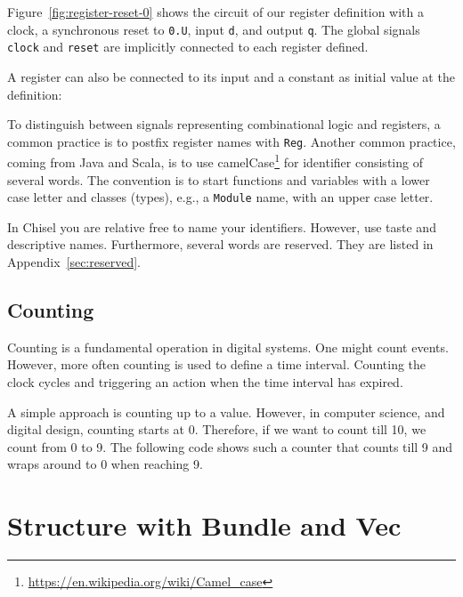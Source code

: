 \documentclass[%
    10pt,
    headinclude, footexclude,
    openright, %
    notitlepage,
    cleardoubleempty,
    headsepline,
    pointlessnumbers,
    bibtotoc, idxtotoc,
    ]{scrbook}
\newcommand{\code}[1]{{\small{\texttt{#1}}}}
\newcommand{\myref}[2]{\href{#1}{#2}}
\renewcommand{\myref}[2]{{#2}{\footnote{\url{#1}}}}
\begin{document}

Figure~\ref{fig:register-reset-0} shows the circuit of our register definition with
a clock, a synchronous reset to \code{0.U}, input \code{d}, and output \code{q}.
The global signals \code{clock} and \code{reset} are implicitly connected to
each register defined.

\noindent A register can also be connected to its input and a constant as
initial value at the definition:


\noindent To distinguish between signals representing combinational logic and registers,
a common practice is to postfix register names with \code{Reg}.
Another common practice, coming from Java and Scala, is to use
\myref{https://en.wikipedia.org/wiki/Camel_case}{camelCase} for
identifier consisting of several words. The convention is to start
functions and variables with a lower case letter and classes (types),
e.g., a \code{Module} name, with an upper case letter.

In Chisel you are relative free to name your identifiers. However, use taste and
descriptive names. Furthermore, several words are reserved. They are listed
in Appendix~\ref{sec:reserved}.




\subsection{Counting}

Counting is a fundamental operation in digital systems. One might count events.
However, more often counting is used to define a time interval. Counting the
clock cycles and triggering an action when the time interval has expired.

A simple approach is counting up to a value. However, in computer science,
and digital design, counting starts at 0. Therefore, if we want to count till
10, we count from 0 to 9. The following code shows such a counter that counts
till 9 and wraps around to 0 when reaching 9.


\section{Structure with Bundle and Vec}

\end{document}

